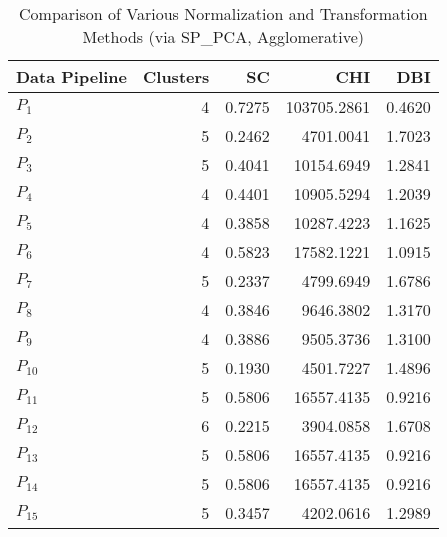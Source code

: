 \begin{table}[t]
\centering
\caption{Comparison of Various Normalization and Transformation Methods (via SP_PCA, Agglomerative)}
\label{tbl:Comparison_SP_PCA_Agglomerative_norm_tran}
\begin{tabular}{lrrrr}
\toprule
Data Pipeline &  Clusters &     SC &         CHI &    DBI \\
\midrule
      $P_{1}$ &         4 & 0.7275 & 103705.2861 & 0.4620 \\
      $P_{2}$ &         5 & 0.2462 &   4701.0041 & 1.7023 \\
      $P_{3}$ &         5 & 0.4041 &  10154.6949 & 1.2841 \\
      $P_{4}$ &         4 & 0.4401 &  10905.5294 & 1.2039 \\
      $P_{5}$ &         4 & 0.3858 &  10287.4223 & 1.1625 \\
      $P_{6}$ &         4 & 0.5823 &  17582.1221 & 1.0915 \\
      $P_{7}$ &         5 & 0.2337 &   4799.6949 & 1.6786 \\
      $P_{8}$ &         4 & 0.3846 &   9646.3802 & 1.3170 \\
      $P_{9}$ &         4 & 0.3886 &   9505.3736 & 1.3100 \\
     $P_{10}$ &         5 & 0.1930 &   4501.7227 & 1.4896 \\
     $P_{11}$ &         5 & 0.5806 &  16557.4135 & 0.9216 \\
     $P_{12}$ &         6 & 0.2215 &   3904.0858 & 1.6708 \\
     $P_{13}$ &         5 & 0.5806 &  16557.4135 & 0.9216 \\
     $P_{14}$ &         5 & 0.5806 &  16557.4135 & 0.9216 \\
     $P_{15}$ &         5 & 0.3457 &   4202.0616 & 1.2989 \\
\bottomrule
\end{tabular}
\end{table}
